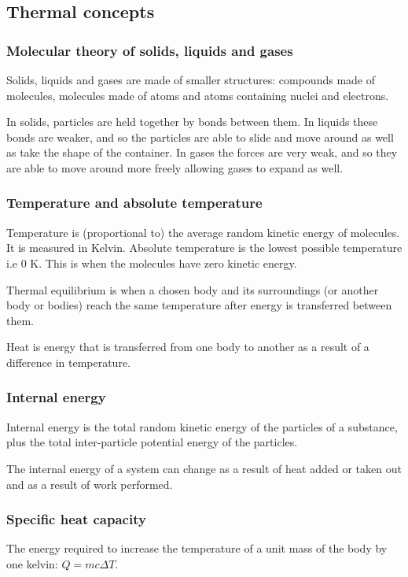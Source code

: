 \subsection{Thermal concepts}

\subsubsection{Molecular theory of solids, liquids and gases}
Solids, liquids and gases are made of smaller structures: compounds made of
molecules, molecules made of atoms and atoms containing nuclei and electrons.

In solids, particles are held together by bonds between them. In liquids these
bonds are weaker, and so the particles are able to slide and move around as
well as take the shape of the container. In gases the forces are very weak, and
so they are able to move around more freely allowing gases to expand as well.

\subsubsection{Temperature and absolute temperature}
Temperature is (proportional to) the average random kinetic energy of
molecules. It is measured in Kelvin. Absolute temperature is the lowest
possible temperature i.e 0 K. This is when the molecules have zero kinetic
energy.

Thermal equilibrium is when a chosen body and its surroundings (or another
body or bodies) reach the same temperature after energy is transferred between
them.

Heat is energy that is transferred from one body to another as a result of a
difference in temperature.

\subsubsection{Internal energy}
Internal energy is the total random kinetic energy of the particles of a
substance, plus the total inter-particle potential energy of the particles.

The internal energy of a system can change as a result of heat added or taken
out and as a result of work performed.

\subsubsection{Specific heat capacity}
The energy required to increase the temperature of a unit mass of the body by
one kelvin: $Q = mc\Delta T$.

